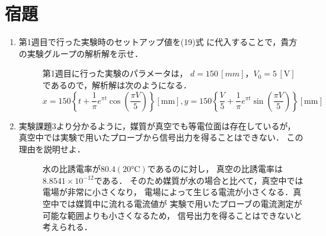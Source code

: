 
\section{宿題}

\begin{enumerate}
    \item 第1週目で行った実験時のセットアップ値を(19)式
    に代入することで，貴方の実験グループの解析解を示せ．
    \begin{description}
        \item[] 第1週目に行った実験のパラメータは，
        $d = 150\,[\si{mm}]，V_0 = 5\,[\si{\volt}]$であるので，解析解は次のようになる．
        $$
        x=150\left\{t+\frac{1}{\pi} e^{\pi t} \cos \left(\frac{\pi V}{5}\right)\right\}[\mathrm{mm}], y=150\left\{\frac{V}{5}+\frac{1}{\pi} e^{\pi t} \sin \left(\frac{\pi V}{5}\right)\right\}[\mathrm{mm}]
        $$
    \end{description}

    \item 実験課題3より分かるように，媒質が真空でも等電位面は存在しているが，
    真空中では実験で用いたプローブから信号出力を得ることはできない．
    この理由を説明せよ．
    \begin{description}
        \item[] 水の比誘電率が$80.4(20\si{\celsius})$であるのに対し，
        真空の比誘電率は$8.8541\times 10^{-12}$である．
        そのため媒質が水の場合と比べて，真空中では電場が非常に小さくなり，
        電場によって生じる電流が小さくなる．真空中では媒質中に流れる電流値が
        実験で用いたプローブの電流測定が可能な範囲よりも小さくなるため，
        信号出力を得ることはできないと考えられる．
    \end{description}
\end{enumerate}